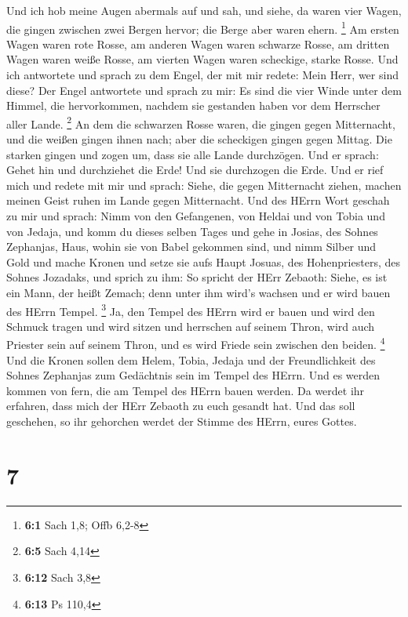  Und ich hob meine Augen abermals auf und sah, und siehe,
da waren vier Wagen, die gingen zwischen zwei Bergen hervor; die Berge
aber waren ehern. \footnote{\textbf{6:1} Sach 1,8; Offb 6,2-8}
 Am ersten Wagen waren rote Rosse, am anderen Wagen waren
schwarze Rosse,  am dritten Wagen waren weiße Rosse, am
vierten Wagen waren scheckige, starke Rosse.  Und ich
antwortete und sprach zu dem Engel, der mit mir redete: Mein Herr, wer
sind diese?  Der Engel antwortete und sprach zu mir: Es
sind die vier Winde unter dem Himmel, die hervorkommen, nachdem sie
gestanden haben vor dem Herrscher aller Lande. \footnote{\textbf{6:5}
  Sach 4,14}  An dem die schwarzen Rosse waren, die gingen
gegen Mitternacht, und die weißen gingen ihnen nach; aber die scheckigen
gingen gegen Mittag.  Die starken gingen und zogen um,
dass sie alle Lande durchzögen. Und er sprach: Gehet hin und durchziehet
die Erde! Und sie durchzogen die Erde.  Und er rief mich
und redete mit mir und sprach: Siehe, die gegen Mitternacht ziehen,
machen meinen Geist ruhen im Lande gegen Mitternacht.  Und
des HErrn Wort geschah zu mir und sprach:  Nimm von den
Gefangenen, von Heldai und von Tobia und von Jedaja, und komm du dieses
selben Tages und gehe in Josias, des Sohnes Zephanjas, Haus, wohin sie
von Babel gekommen sind,  und nimm Silber und Gold und
mache Kronen und setze sie aufs Haupt Josuas, des Hohenpriesters, des
Sohnes Jozadaks,  und sprich zu ihm: So spricht der HErr
Zebaoth: Siehe, es ist ein Mann, der heißt Zemach; denn unter ihm wird's
wachsen und er wird bauen des HErrn Tempel. \footnote{\textbf{6:12} Sach
  3,8}  Ja, den Tempel des HErrn wird er bauen und wird
den Schmuck tragen und wird sitzen und herrschen auf seinem Thron, wird
auch Priester sein auf seinem Thron, und es wird Friede sein zwischen
den beiden. \footnote{\textbf{6:13} Ps 110,4}  Und die
Kronen sollen dem Helem, Tobia, Jedaja und der Freundlichkeit des Sohnes
Zephanjas zum Gedächtnis sein im Tempel des HErrn.  Und
es werden kommen von fern, die am Tempel des HErrn bauen werden. Da
werdet ihr erfahren, dass mich der HErr Zebaoth zu euch gesandt hat. Und
das soll geschehen, so ihr gehorchen werdet der Stimme des HErrn, eures
Gottes.

\hypertarget{section-6}{%
\section{7}\label{section-6}}

